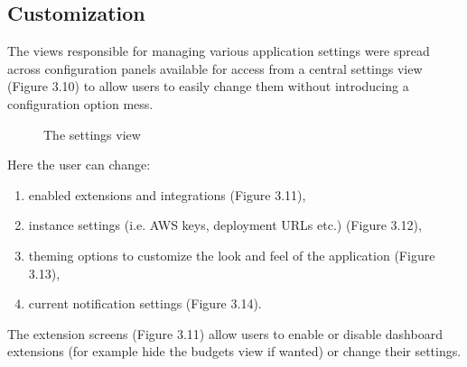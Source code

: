 \documentclass[licencjacka,en]{thesisclass}
\begin{document}
    \subsection{Customization}

    The views responsible for managing various application settings
    were spread across configuration panels available for access
    from a central settings view (Figure 3.10) to allow users to easily change
    them without introducing a configuration option mess.

    \begin{figure}[H]
      \caption{The settings view\label{fig:scr-customize}}
    \end{figure}

    Here the user can change:
    \begin{enumerate}
        \item enabled extensions and integrations (Figure 3.11),
        \item instance settings (i.e. AWS keys, deployment URLs etc.) (Figure 3.12),
        \item theming options to customize the look and feel of the application (Figure 3.13),
        \item current notification settings (Figure 3.14).
    \end{enumerate}

    The extension screens (Figure 3.11) allow users to enable or disable
    dashboard extensions (for example hide the budgets view if wanted) or change their settings.
\end{document}
